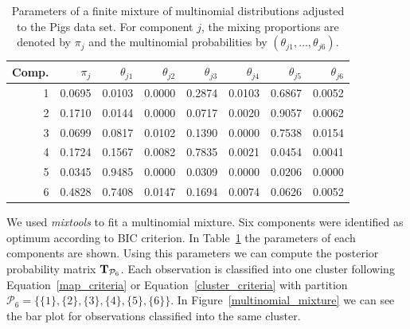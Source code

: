 \documentclass[submit]{smj}
\theoremstyle{definition}
\begin{document}
\begin{table}[t]
\centering
\begin{tabular}{rrrrrrrr}
  \hline
 Comp.& $\pi_j$ & $\theta_{j1}$ & $\theta_{j2}$ & $\theta_{j3}$ & $\theta_{j4}$ & $\theta_{j5}$ & $\theta_{j6}$ \\ 
  \hline
  1 & 0.0695 & 0.0103 & 0.0000 & 0.2874 & 0.0103 & 0.6867 & 0.0052 \\ 
  2 & 0.1710 & 0.0144 & 0.0000 & 0.0717 & 0.0020 & 0.9057 & 0.0062 \\ 
  3 & 0.0699 & 0.0817 & 0.0102 & 0.1390 & 0.0000 & 0.7538 & 0.0154 \\ 
  4 & 0.1724 & 0.1567 & 0.0082 & 0.7835 & 0.0021 & 0.0454 & 0.0041 \\ 
  5 & 0.0345 & 0.9485 & 0.0000 & 0.0309 & 0.0000 & 0.0206 & 0.0000 \\ 
  6 & 0.4828 & 0.7408 & 0.0147 & 0.1694 & 0.0074 & 0.0626 & 0.0052 \\  
   \hline
\end{tabular}
\caption{Parameters of a finite mixture of multinomial distributions adjusted to the Pigs data set. For component $j$, the mixing proportions are denoted by $\pi_j$ and the multinomial probabilities by $\left(\theta_{j1}, \dots, \theta_{j6}\right)$.}\label{multinomial_pars}
\end{table}

We used \emph{mixtools} \citep{benaglia2009mixtools} to fit a multinomial mixture. Six components were identified as optimum according to BIC criterion. In Table~\ref{multinomial_pars} the parameters of each components are shown. Using this parameters we can compute the posterior probability matrix $\text{\textbf{T}}_{\mathcal{P}_6}$. Each observation is classified into one cluster following Equation~\ref{map_criteria} or Equation~\ref{cluster_criteria} with partition $\mathcal{P}_6 = \{\{1\}, \{2\}, \{3\}, \{4\}, \{5\}, \{6\}\}$. In Figure~\ref{multinomial_mixture} we can see the bar plot for observations classified into the same cluster.
\end{document}
